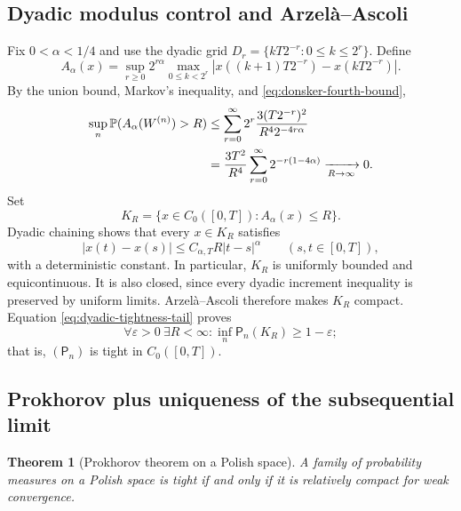 \documentclass[10pt,a4paper]{article}
\numberwithin{equation}{section}
\theoremstyle{blueplain}
\newtheorem{theorem}{Theorem}[section]
\theoremstyle{definition}
\newcommand{\Pp}{\mathbb P}
\begin{document}
\subsection{Dyadic modulus control and Arzel\`a--Ascoli}

Fix \(0<\alpha<1/4\) and use the dyadic grid
\(D_r=\{kT2^{-r}:0\le k\le2^r\}\).  Define
\begin{equation}
 A_\alpha(x)
 =\sup_{r\ge0}2^{r\alpha}
   \max_{0\le k<2^r}
   |x((k+1)T2^{-r})-x(kT2^{-r})|.
 \label{eq:dyadic-holder-functional}
\end{equation}
By the union bound, Markov's inequality, and
\eqref{eq:donsker-fourth-bound},
\begin{align}
 \sup_n\Pp(A_\alpha(W^{(n)})>R)
 &\le \sum_{r=0}^\infty
 2^r\frac{3(T2^{-r})^2}{R^4 2^{-4r\alpha}}\notag\\
 &=\frac{3T^2}{R^4}
   \sum_{r=0}^\infty2^{-r(1-4\alpha)}
 \xrightarrow[R\to\infty]{}0.
 \label{eq:dyadic-tightness-tail}
\end{align}
Set
\[
 K_R=\{x\in C_0([0,T]):A_\alpha(x)\le R\}.
\]
Dyadic chaining shows that every \(x\in K_R\) satisfies
\begin{equation}
 |x(t)-x(s)|\le C_{\alpha,T}R|t-s|^\alpha
 \qquad(s,t\in[0,T]),
 \label{eq:dyadic-chaining-modulus}
\end{equation}
with a deterministic constant.  In particular, \(K_R\) is uniformly bounded
and equicontinuous.  It is also closed, since every dyadic increment inequality
is preserved by uniform limits.  Arzel\`a--Ascoli therefore makes \(K_R\)
compact.  Equation \eqref{eq:dyadic-tightness-tail} proves
\begin{equation}
  \forall\varepsilon>0\ \exists R<\infty:
  \inf_n\mathsf P_n(K_R)\ge1-\varepsilon;
  \label{eq:donsker-tightness}
\end{equation}
that is, \((\mathsf P_n)\) is tight in \(C_0([0,T])\).

\subsection{Prokhorov plus uniqueness of the subsequential limit}

\begin{theorem}[Prokhorov theorem on a Polish space]
A family of probability measures on a Polish space is tight if and only if it
is relatively compact for weak convergence.
\end{theorem}
\end{document}

